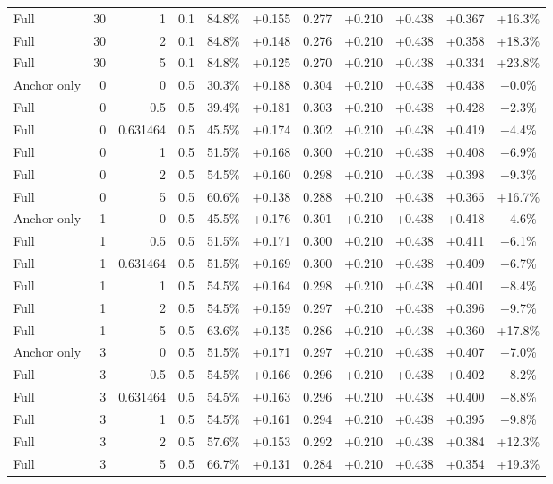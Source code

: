 \begin{table}[htbp]
\begin{tabular}{lrrrccccccc}
Full & 30 & 1 & 0.1 & 84.8\% & +0.155 & 0.277 & +0.210 & +0.438 & +0.367 & +16.3\% \\
Full & 30 & 2 & 0.1 & 84.8\% & +0.148 & 0.276 & +0.210 & +0.438 & +0.358 & +18.3\% \\
Full & 30 & 5 & 0.1 & 84.8\% & +0.125 & 0.270 & +0.210 & +0.438 & +0.334 & +23.8\% \\
Anchor only & 0 & 0 & 0.5 & 30.3\% & +0.188 & 0.304 & +0.210 & +0.438 & +0.438 & +0.0\% \\
Full & 0 & 0.5 & 0.5 & 39.4\% & +0.181 & 0.303 & +0.210 & +0.438 & +0.428 & +2.3\% \\
Full & 0 & 0.631464 & 0.5 & 45.5\% & +0.174 & 0.302 & +0.210 & +0.438 & +0.419 & +4.4\% \\
Full & 0 & 1 & 0.5 & 51.5\% & +0.168 & 0.300 & +0.210 & +0.438 & +0.408 & +6.9\% \\
Full & 0 & 2 & 0.5 & 54.5\% & +0.160 & 0.298 & +0.210 & +0.438 & +0.398 & +9.3\% \\
Full & 0 & 5 & 0.5 & 60.6\% & +0.138 & 0.288 & +0.210 & +0.438 & +0.365 & +16.7\% \\
Anchor only & 1 & 0 & 0.5 & 45.5\% & +0.176 & 0.301 & +0.210 & +0.438 & +0.418 & +4.6\% \\
Full & 1 & 0.5 & 0.5 & 51.5\% & +0.171 & 0.300 & +0.210 & +0.438 & +0.411 & +6.1\% \\
Full & 1 & 0.631464 & 0.5 & 51.5\% & +0.169 & 0.300 & +0.210 & +0.438 & +0.409 & +6.7\% \\
Full & 1 & 1 & 0.5 & 54.5\% & +0.164 & 0.298 & +0.210 & +0.438 & +0.401 & +8.4\% \\
Full & 1 & 2 & 0.5 & 54.5\% & +0.159 & 0.297 & +0.210 & +0.438 & +0.396 & +9.7\% \\
Full & 1 & 5 & 0.5 & 63.6\% & +0.135 & 0.286 & +0.210 & +0.438 & +0.360 & +17.8\% \\
Anchor only & 3 & 0 & 0.5 & 51.5\% & +0.171 & 0.297 & +0.210 & +0.438 & +0.407 & +7.0\% \\
Full & 3 & 0.5 & 0.5 & 54.5\% & +0.166 & 0.296 & +0.210 & +0.438 & +0.402 & +8.2\% \\
Full & 3 & 0.631464 & 0.5 & 54.5\% & +0.163 & 0.296 & +0.210 & +0.438 & +0.400 & +8.8\% \\
Full & 3 & 1 & 0.5 & 54.5\% & +0.161 & 0.294 & +0.210 & +0.438 & +0.395 & +9.8\% \\
Full & 3 & 2 & 0.5 & 57.6\% & +0.153 & 0.292 & +0.210 & +0.438 & +0.384 & +12.3\% \\
Full & 3 & 5 & 0.5 & 66.7\% & +0.131 & 0.284 & +0.210 & +0.438 & +0.354 & +19.3\% \\

\end{tabular}
\end{table}
